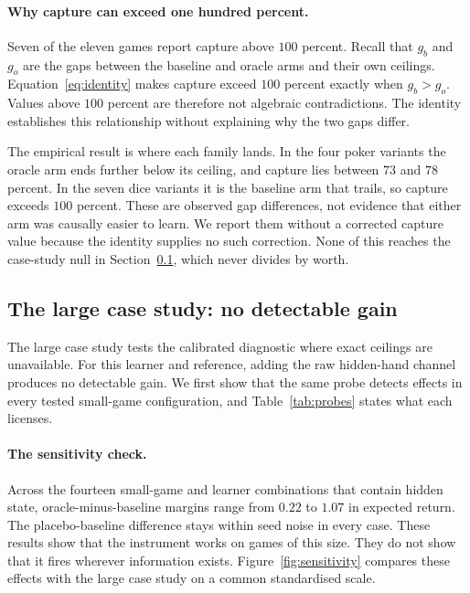 \documentclass{article}
\begin{document}
\paragraph{Why capture can exceed one hundred percent.} Seven of the eleven games report capture above $100$ percent. Recall that $g_b$ and $g_o$ are the gaps between the baseline and oracle arms and their own ceilings. Equation~\eqref{eq:identity} makes capture exceed $100$ percent exactly when $g_b > g_o$. Values above $100$ percent are therefore not algebraic contradictions. The identity establishes this relationship without explaining why the two gaps differ.

The empirical result is where each family lands. In the four poker variants the oracle arm ends further below its ceiling, and capture lies between $73$ and $78$ percent. In the seven dice variants it is the baseline arm that trails, so capture exceeds $100$ percent. These are observed gap differences, not evidence that either arm was causally easier to learn. We report them without a corrected capture value because the identity supplies no such correction. None of this reaches the case-study null in Section~\ref{sec:r-case}, which never divides by worth.

\FloatBarrier
\subsection{The large case study: no detectable gain}
\label{sec:r-case}

The large case study tests the calibrated diagnostic where exact ceilings are unavailable. For this learner and reference, adding the raw hidden-hand channel produces no detectable gain. We first show that the same probe detects effects in every tested small-game configuration, and Table~\ref{tab:probes} states what each licenses.

\paragraph{The sensitivity check.} Across the fourteen small-game and learner combinations that contain hidden state, oracle-minus-baseline margins range from $0.22$ to $1.07$ in expected return. The placebo-baseline difference stays within seed noise in every case. These results show that the instrument works on games of this size. They do not show that it fires wherever information exists. Figure~\ref{fig:sensitivity} compares these effects with the large case study on a common standardised scale.
\end{document}

